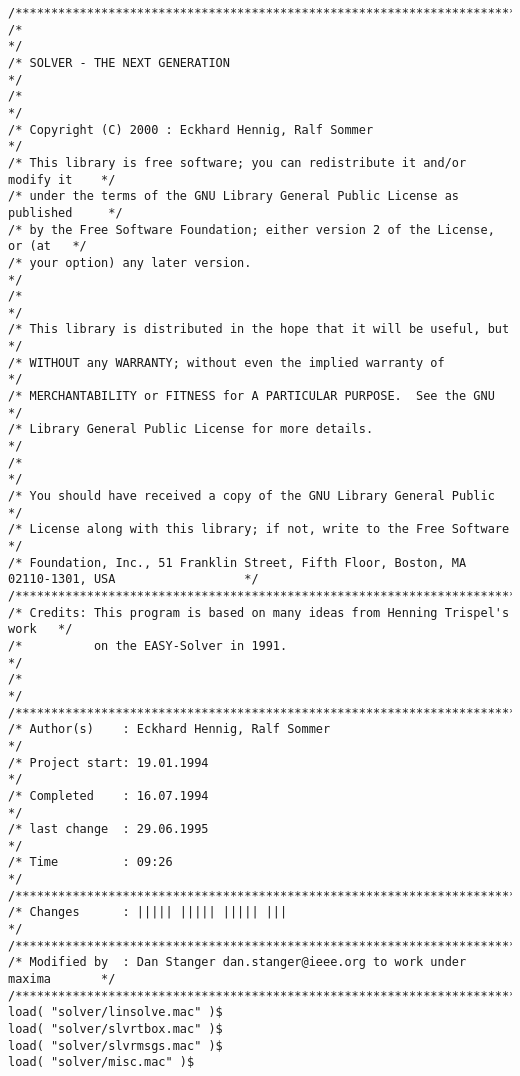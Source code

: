 \begin{verbatim}
/******************************************************************************/
/*                                                                            */
/* SOLVER - THE NEXT GENERATION                                               */
/*                                                                            */
/* Copyright (C) 2000 : Eckhard Hennig, Ralf Sommer                           */
/* This library is free software; you can redistribute it and/or modify it    */
/* under the terms of the GNU Library General Public License as published     */
/* by the Free Software Foundation; either version 2 of the License, or (at   */
/* your option) any later version.                                            */
/*                                                                            */
/* This library is distributed in the hope that it will be useful, but        */
/* WITHOUT any WARRANTY; without even the implied warranty of                 */
/* MERCHANTABILITY or FITNESS for A PARTICULAR PURPOSE.  See the GNU          */
/* Library General Public License for more details.                           */
/*                                                                            */
/* You should have received a copy of the GNU Library General Public          */
/* License along with this library; if not, write to the Free Software        */
/* Foundation, Inc., 51 Franklin Street, Fifth Floor, Boston, MA  02110-1301, USA                  */
/******************************************************************************/
/* Credits: This program is based on many ideas from Henning Trispel's work   */
/*          on the EASY-Solver in 1991.                                       */
/*                                                                            */
/******************************************************************************/
/* Author(s)    : Eckhard Hennig, Ralf Sommer                                 */
/* Project start: 19.01.1994                                                  */
/* Completed    : 16.07.1994                                                  */
/* last change  : 29.06.1995                                                  */
/* Time         : 09:26                                                       */
/******************************************************************************/
/* Changes      : ||||| ||||| ||||| |||                                       */
/******************************************************************************/
/* Modified by  : Dan Stanger dan.stanger@ieee.org to work under maxima       */
/******************************************************************************/
load( "solver/linsolve.mac" )$
load( "solver/slvrtbox.mac" )$
load( "solver/slvrmsgs.mac" )$
load( "solver/misc.mac" )$


\end{verbatim}
